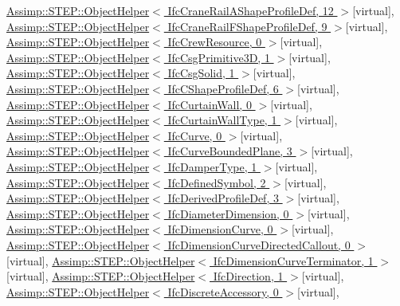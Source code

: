 \hyperlink{struct_assimp_1_1_s_t_e_p_1_1_object_helper}{Assimp\+::\+S\+T\+E\+P\+::\+Object\+Helper$<$ Ifc\+Crane\+Rail\+A\+Shape\+Profile\+Def, 12 $>$}{\ttfamily  \mbox{[}virtual\mbox{]}}, \hyperlink{struct_assimp_1_1_s_t_e_p_1_1_object_helper}{Assimp\+::\+S\+T\+E\+P\+::\+Object\+Helper$<$ Ifc\+Crane\+Rail\+F\+Shape\+Profile\+Def, 9 $>$}{\ttfamily  \mbox{[}virtual\mbox{]}}, \hyperlink{struct_assimp_1_1_s_t_e_p_1_1_object_helper}{Assimp\+::\+S\+T\+E\+P\+::\+Object\+Helper$<$ Ifc\+Crew\+Resource, 0 $>$}{\ttfamily  \mbox{[}virtual\mbox{]}}, \hyperlink{struct_assimp_1_1_s_t_e_p_1_1_object_helper}{Assimp\+::\+S\+T\+E\+P\+::\+Object\+Helper$<$ Ifc\+Csg\+Primitive3\+D, 1 $>$}{\ttfamily  \mbox{[}virtual\mbox{]}}, \hyperlink{struct_assimp_1_1_s_t_e_p_1_1_object_helper}{Assimp\+::\+S\+T\+E\+P\+::\+Object\+Helper$<$ Ifc\+Csg\+Solid, 1 $>$}{\ttfamily  \mbox{[}virtual\mbox{]}}, \hyperlink{struct_assimp_1_1_s_t_e_p_1_1_object_helper}{Assimp\+::\+S\+T\+E\+P\+::\+Object\+Helper$<$ Ifc\+C\+Shape\+Profile\+Def, 6 $>$}{\ttfamily  \mbox{[}virtual\mbox{]}}, \hyperlink{struct_assimp_1_1_s_t_e_p_1_1_object_helper}{Assimp\+::\+S\+T\+E\+P\+::\+Object\+Helper$<$ Ifc\+Curtain\+Wall, 0 $>$}{\ttfamily  \mbox{[}virtual\mbox{]}}, \hyperlink{struct_assimp_1_1_s_t_e_p_1_1_object_helper}{Assimp\+::\+S\+T\+E\+P\+::\+Object\+Helper$<$ Ifc\+Curtain\+Wall\+Type, 1 $>$}{\ttfamily  \mbox{[}virtual\mbox{]}}, \hyperlink{struct_assimp_1_1_s_t_e_p_1_1_object_helper}{Assimp\+::\+S\+T\+E\+P\+::\+Object\+Helper$<$ Ifc\+Curve, 0 $>$}{\ttfamily  \mbox{[}virtual\mbox{]}}, \hyperlink{struct_assimp_1_1_s_t_e_p_1_1_object_helper}{Assimp\+::\+S\+T\+E\+P\+::\+Object\+Helper$<$ Ifc\+Curve\+Bounded\+Plane, 3 $>$}{\ttfamily  \mbox{[}virtual\mbox{]}}, \hyperlink{struct_assimp_1_1_s_t_e_p_1_1_object_helper}{Assimp\+::\+S\+T\+E\+P\+::\+Object\+Helper$<$ Ifc\+Damper\+Type, 1 $>$}{\ttfamily  \mbox{[}virtual\mbox{]}}, \hyperlink{struct_assimp_1_1_s_t_e_p_1_1_object_helper}{Assimp\+::\+S\+T\+E\+P\+::\+Object\+Helper$<$ Ifc\+Defined\+Symbol, 2 $>$}{\ttfamily  \mbox{[}virtual\mbox{]}}, \hyperlink{struct_assimp_1_1_s_t_e_p_1_1_object_helper}{Assimp\+::\+S\+T\+E\+P\+::\+Object\+Helper$<$ Ifc\+Derived\+Profile\+Def, 3 $>$}{\ttfamily  \mbox{[}virtual\mbox{]}}, \hyperlink{struct_assimp_1_1_s_t_e_p_1_1_object_helper}{Assimp\+::\+S\+T\+E\+P\+::\+Object\+Helper$<$ Ifc\+Diameter\+Dimension, 0 $>$}{\ttfamily  \mbox{[}virtual\mbox{]}}, \hyperlink{struct_assimp_1_1_s_t_e_p_1_1_object_helper}{Assimp\+::\+S\+T\+E\+P\+::\+Object\+Helper$<$ Ifc\+Dimension\+Curve, 0 $>$}{\ttfamily  \mbox{[}virtual\mbox{]}}, \hyperlink{struct_assimp_1_1_s_t_e_p_1_1_object_helper}{Assimp\+::\+S\+T\+E\+P\+::\+Object\+Helper$<$ Ifc\+Dimension\+Curve\+Directed\+Callout, 0 $>$}{\ttfamily  \mbox{[}virtual\mbox{]}}, \hyperlink{struct_assimp_1_1_s_t_e_p_1_1_object_helper}{Assimp\+::\+S\+T\+E\+P\+::\+Object\+Helper$<$ Ifc\+Dimension\+Curve\+Terminator, 1 $>$}{\ttfamily  \mbox{[}virtual\mbox{]}}, \hyperlink{struct_assimp_1_1_s_t_e_p_1_1_object_helper}{Assimp\+::\+S\+T\+E\+P\+::\+Object\+Helper$<$ Ifc\+Direction, 1 $>$}{\ttfamily  \mbox{[}virtual\mbox{]}}, \hyperlink{struct_assimp_1_1_s_t_e_p_1_1_object_helper}{Assimp\+::\+S\+T\+E\+P\+::\+Object\+Helper$<$ Ifc\+Discrete\+Accessory, 0 $>$}{\ttfamily  \mbox{[}virtual\mbox{]}}, 